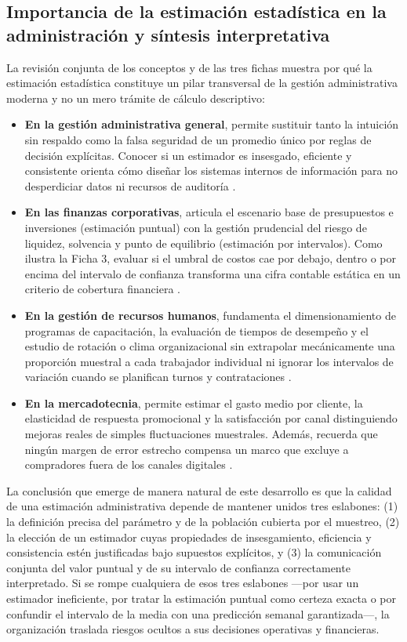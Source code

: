 {\subsection{Importancia de la estimación estadística en la administración y síntesis interpretativa}
La revisión conjunta de los conceptos y de las tres fichas muestra por qué la estimación estadística constituye un pilar transversal de la gestión administrativa moderna y no un mero trámite de cálculo descriptivo:
\begin{itemize}
  \item \textbf{En la gestión administrativa general}, permite sustituir tanto la intuición sin respaldo como la falsa seguridad de un promedio único por reglas de decisión explícitas. Conocer si un estimador es insesgado, eficiente y consistente orienta cómo diseñar los sistemas internos de información para no desperdiciar datos ni recursos de auditoría \citep{wackerly2010}.
  \item \textbf{En las finanzas corporativas}, articula el escenario base de presupuestos e inversiones (estimación puntual) con la gestión prudencial del riesgo de liquidez, solvencia y punto de equilibrio (estimación por intervalos). Como ilustra la Ficha 3, evaluar si el umbral de costos cae por debajo, dentro o por encima del intervalo de confianza transforma una cifra contable estática en un criterio de cobertura financiera \citep{nistHandbook,holmesBusiness2023}.
  \item \textbf{En la gestión de recursos humanos}, fundamenta el dimensionamiento de programas de capacitación, la evaluación de tiempos de desempeño y el estudio de rotación o clima organizacional sin extrapolar mecánicamente una proporción muestral a cada trabajador individual ni ignorar los intervalos de variación cuando se planifican turnos y contrataciones \citep{holmesBusiness2023}.
  \item \textbf{En la mercadotecnia}, permite estimar el gasto medio por cliente, la elasticidad de respuesta promocional y la satisfacción por canal distinguiendo mejoras reales de simples fluctuaciones muestrales. Además, recuerda que ningún margen de error estrecho compensa un marco que excluye a compradores fuera de los canales digitales \citep{bradley2021}.
\end{itemize}

La conclusión que emerge de manera natural de este desarrollo es que la calidad de una estimación administrativa depende de mantener unidos tres eslabones: (1) la definición precisa del parámetro y de la población cubierta por el muestreo, (2) la elección de un estimador cuyas propiedades de insesgamiento, eficiencia y consistencia estén justificadas bajo supuestos explícitos, y (3) la comunicación conjunta del valor puntual y de su intervalo de confianza correctamente interpretado. Si se rompe cualquiera de esos tres eslabones —por usar un estimador ineficiente, por tratar la estimación puntual como certeza exacta o por confundir el intervalo de la media con una predicción semanal garantizada—, la organización traslada riesgos ocultos a sus decisiones operativas y financieras.

}
